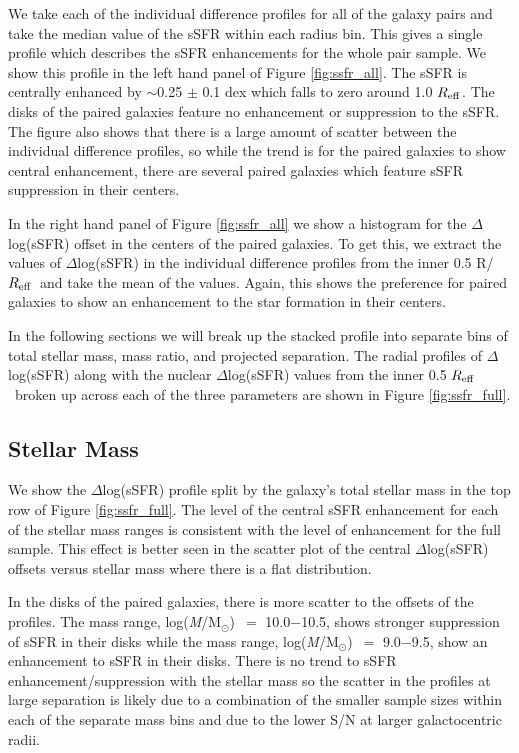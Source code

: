 \documentclass[iop,revtex4,twocolumn,apj,numberedappendix,appendixfloats]{emulateapj}
\newcommand{\reff}{$R_{\rm eff}$}
\newcommand{\logm}{log({\it M}/M$_{\odot}$)}
\begin{document}
We take each of the individual difference profiles for all of the galaxy pairs and take the median value of the sSFR within each radius bin. This gives a single profile which describes the sSFR enhancements for the whole pair sample. We show this profile in the left hand panel of Figure \ref{fig:ssfr_all}. The sSFR is centrally enhanced by $\sim$0.25 $\pm$ 0.1 dex which falls to zero around 1.0 \reff. The disks of the paired galaxies feature no enhancement or suppression to the sSFR. The figure also shows that there is a large amount of scatter between the individual difference profiles, so while the trend is for the paired galaxies to show central enhancement, there are several paired galaxies which feature sSFR suppression in their centers. 

In the right hand panel of Figure \ref{fig:ssfr_all} we show a histogram for the $\Delta$log(sSFR) offset in the centers of the paired galaxies. To get this, we extract the values of $\Delta$log(sSFR) in the individual difference profiles from the inner 0.5 R/\reff\ and take the mean of the values. Again, this shows the preference for paired galaxies to show an enhancement to the star formation in their centers. 

In the following sections we will break up the stacked profile into separate bins of total stellar mass, mass ratio, and projected separation. The radial profiles of $\Delta$log(sSFR) along with the nuclear $\Delta$log(sSFR) values from the inner 0.5 \reff\ broken up across each of the three parameters are shown in Figure \ref{fig:ssfr_full}.

\subsection{Stellar Mass}
We show the $\Delta$log(sSFR) profile split by the galaxy's total stellar mass in the top row of Figure \ref{fig:ssfr_full}. The level of the central sSFR enhancement for each of the stellar mass ranges is consistent with the level of enhancement for the full sample. This effect is better seen in the scatter plot of the central $\Delta$log(sSFR) offsets versus stellar mass where there is a flat distribution. 

In the disks of the paired galaxies, there is more scatter to the offsets of the profiles. The mass range, \logm\ $=$ 10.0$-$10.5, shows stronger suppression of sSFR in their disks while the mass range, \logm\ $=$ 9.0$-$9.5, show an enhancement to sSFR in their disks. There is no trend to sSFR enhancement/suppression with the stellar mass so the scatter in the profiles at large separation is likely due to a combination of the smaller sample sizes within each of the separate mass bins and due to the lower S/N at larger galactocentric radii.
\end{document}

